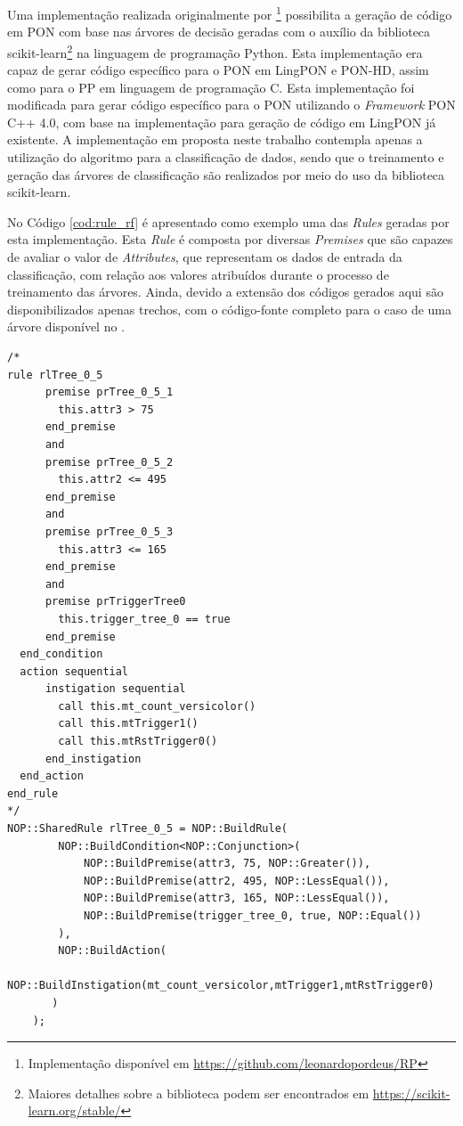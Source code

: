 Uma implementação realizada originalmente por 
\footnote{Implementação disponível em
\url{https://github.com/leonardopordeus/RP}} possibilita a geração de código em
PON com base nas árvores de decisão geradas com o auxílio da biblioteca
scikit-learn\footnote{Maiores detalhes sobre a biblioteca podem ser encontrados
em \url{https://scikit-learn.org/stable/}} na linguagem de programação Python.
Esta implementação era capaz de gerar código específico para o PON em LingPON e
PON-HD, assim como para o PP em linguagem de programação C. Esta implementação
foi modificada para gerar código específico para o PON utilizando o
\textit{Framework} PON C++ 4.0, com base na implementação para geração de código
em LingPON já existente. A implementação em proposta neste trabalho contempla
apenas a utilização do algoritmo para a classificação de dados, sendo que o
treinamento e geração das árvores de classificação são realizados por meio do
uso da biblioteca scikit-learn.

No Código \ref{cod:rule_rf} é apresentado como
exemplo uma das \textit{Rules} geradas por esta implementação. Esta
\textit{Rule} é composta por diversas \textit{Premises} que são capazes de
avaliar o valor de \textit{Attributes}, que representam os dados de entrada da
classificação, com relação aos valores atribuídos durante o processo de
treinamento das árvores. Ainda, devido a extensão dos códigos gerados aqui são
disponibilizados apenas trechos, com o código-fonte completo para o caso de uma
árvore disponível no .

\begin{lstlisting}[caption = {\textit{Rule} do algoritmo \textit{Random Forest} para o \textit{Framework} PON C++ 4.0},
  source = {Autoria própria}, %float=htb,
  label = {cod:rule_rf},
]
/*
rule rlTree_0_5
      premise prTree_0_5_1
        this.attr3 > 75
      end_premise
      and
      premise prTree_0_5_2
        this.attr2 <= 495
      end_premise
      and
      premise prTree_0_5_3
        this.attr3 <= 165
      end_premise
      and
      premise prTriggerTree0
        this.trigger_tree_0 == true
      end_premise
  end_condition
  action sequential
      instigation sequential
        call this.mt_count_versicolor()
        call this.mtTrigger1()
        call this.mtRstTrigger0()
      end_instigation
  end_action
end_rule
*/
NOP::SharedRule rlTree_0_5 = NOP::BuildRule(
        NOP::BuildCondition<NOP::Conjunction>(
            NOP::BuildPremise(attr3, 75, NOP::Greater()),
            NOP::BuildPremise(attr2, 495, NOP::LessEqual()),
            NOP::BuildPremise(attr3, 165, NOP::LessEqual()),
            NOP::BuildPremise(trigger_tree_0, true, NOP::Equal())
        ),
        NOP::BuildAction(
            NOP::BuildInstigation(mt_count_versicolor,mtTrigger1,mtRstTrigger0)
       )
    );
\end{lstlisting}

